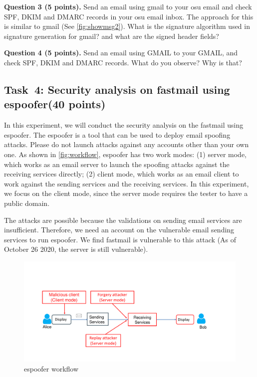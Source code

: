 \documentclass[11pt]{article}
\newcommand{\espoofer}{{\sf espoofer}\xspace}
\newcommand{\dmark}{{\sf DMARC}\xspace}
\newcommand{\dkim}{{\sf DKIM}\xspace}
\newcommand{\spf}{{\sf SPF}\xspace}
\begin{document}
\begin{enumerate}
\textbf{Question 3 (5 points).} Send an email using gmail to your osu email and check \spf, \dkim and \dmark records in your osu email inbox. The approach for this is similar to gmail (See \autoref{fig:showmsg2}). What is the signature algorithm used in signature generation for gmail? and what are the signed header fields? 

\textbf{Question 4 (5 points).} Send an email using GMAIL to your GMAIL, and check \spf, \dkim and \dmark records. What do you observe? Why is that?
\end{enumerate}



\subsection{Task~4: Security analysis on \textsf{fastmail} using \espoofer (40 points)}

In this experiment, we will conduct the security analysis on the \textsf{fastmail} using \espoofer. The \espoofer is a tool that can be used to deploy email spoofing attacks. Please do not launch attacks against any accounts other than your own one.  As shown in \autoref{fig:workflow}, \espoofer has two work modes: (1) server mode, which works as an email server to launch the spoofing attacks against the receiving services directly; (2) client mode, which works as an email client to work against the sending services and the  receiving services. In this experiment, we focus on the client mode, since the server mode requires the tester to have a public domain.

 

The attacks are possible because the validations on sending email services are insufficient. Therefore, we need an account on the vulnerable email sending services to run \espoofer.  We find \textsf{fastmail} is vulnerable to this attack (As of October 26 2020, the server is still vulnerable). 

\begin{figure} [h]
\centering
\vspace{-2mm}
\includegraphics[width=0.88\columnwidth]{espoofer}
 
\caption{\espoofer workflow}\label{fig:workflow}
\end{figure}
\end{document}
